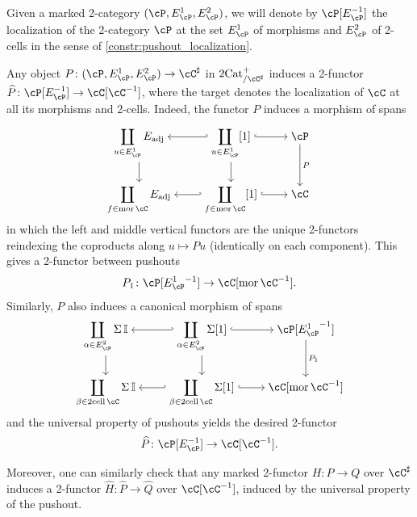\documentclass[11pt, dvipsnames]{amsart}
\begin{document}
\begin{notation}
    Given a marked 2-category $(\cP,E^1_\cP,E^2_\cP)$, we will denote by $\cP[E_\cP^{-1}]$ the localization of the 2-category $\cP$ at the set $E^1_\cP$ of morphisms and $E^2_\cP$ of 2-cells in the sense of \cref{constr:pushout_localization}.
\end{notation}


\begin{rmk}\label{remark:Phat_preserves_normal_forms}
	Any object $P\colon (\cP, E^1_\cP, E^2_\cP) \to \cC^\sharp$ in $\mslicetwocat$ induces a 2-functor $\widehat{P}\colon \cP[E_{\cP}^{-1}] \to \cC[\cC^{-1}]$, where the target denotes the localization of $\cC$ at all its morphisms and 2-cells. Indeed, the functor $P$ induces a morphism of spans
    
	\[\begin{tikzcd}[ampersand replacement=\&,cramped]
		{\displaystyle \coprod_{u \in {E^1_{\cP}}} E_{\mathrm{adj}}} \& {\displaystyle\coprod_{u \in {E^1_{\cP}}}[1]} \& \cP \\
		{\displaystyle\coprod_{f \in \operatorname{mor}\cC}E_{\mathrm{adj}}} \& {\displaystyle\coprod_{f \in \operatorname{mor}\cC}[1]} \& \cC
		\arrow[from=1-1, to=2-1]
		\arrow[hook', from=1-2, to=1-1]
		\arrow[hook, from=1-2, to=1-3]
		\arrow[from=1-2, to=2-2]
		\arrow["P", from=1-3, to=2-3]
		\arrow[hook', from=2-2, to=2-1]
		\arrow[hook, from=2-2, to=2-3]
	\end{tikzcd}\]
	in which the left and middle vertical functors are the unique 2-functors reindexing
	the coproducts along $u \mapsto Pu$ (identically on each component). This gives a 2-functor between pushouts $$P_1 \colon \cP[\smash{{E^1_{\cP}}}^{-1}] \to \cC[\operatorname{mor}\cC^{-1}].$$ 
	Similarly, $P$ also induces a canonical morphism of spans
	\[\begin{tikzcd}[ampersand replacement=\&,cramped]
		{\displaystyle \coprod_{\alpha \in {E^2_{\cP}}} \Sigma \interval} \& {\displaystyle\coprod_{\alpha \in {E^2_{\cP}}}\Sigma[1]} \& {\cP[{E^1_{\cP}}^{-1}]} \\
		{\displaystyle\coprod_{\beta \in \operatorname{2cell}\cC} \Sigma \interval} \& {\displaystyle\coprod_{\beta \in \operatorname{2cell}\cC}\Sigma[1]} \& {\cC[\operatorname{mor}\cC^{-1}]}
		\arrow[from=1-1, to=2-1]
		\arrow[hook', from=1-2, to=1-1]
		\arrow[hook, from=1-2, to=1-3]
		\arrow[from=1-2, to=2-2]
		\arrow["{P_1}", from=1-3, to=2-3]
		\arrow[hook', from=2-2, to=2-1]
		\arrow[hook, from=2-2, to=2-3]
	\end{tikzcd}\]
    and the universal property of pushouts yields the desired 2-functor $$\widehat{P} \colon \cP[E_{\cP}^{-1}] \to \cC[\cC^{-1}].$$

    Moreover, one can similarly check that any marked 2-functor $H\colon P\to Q$ over $\cC^\sharp$ induces a 2-functor $\widehat{H}\colon\widehat{P}\to \widehat{Q}$ over $\cC[\cC^{-1}]$, induced by the universal property of the pushout.
\end{rmk}
\end{document}
